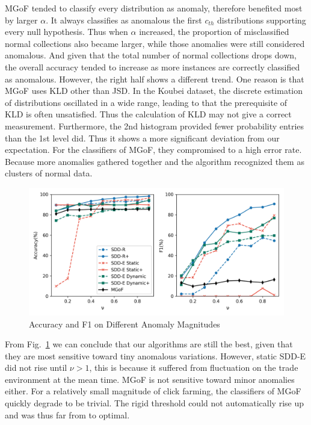 \documentclass[10pt,conference,letterpaper]{article}
\begin{document}
			MGoF tended to classify every distribution as anomaly, therefore benefited most by larger $\alpha$. It always classifies as anomalous the first $c_{th}$ distributions supporting every null hypothesis. Thus when $\alpha$ increased, the proportion of misclassified normal collections also became larger, while those anomalies were still considered anomalous. And given that the total number of normal collections drops down, the overall accuracy tended to increase as more instances are correctly classified as anomalous. However, the right half shows a different trend. One reason is that MGoF uses KLD other than JSD. In the Koubei dataset, the discrete estimation of distributions oscillated in a wide range, leading to that the prerequisite of KLD is often unsatisfied. Thus the calculation of KLD may not give a correct measurement. Furthermore, the 2nd histogram provided fewer probability entries than the 1st level did. Thus it shows a more significant deviation from our expectation.
			For the classifiers of MGoF, they  compromised to a high error rate. Because more anomalies gathered together and the algorithm recognized them as clusters of normal data.
			
			\begin{figure}[!t]
				\includegraphics[width=\linewidth]{fig/PerformanceOnAnomalyMagnitude.png}
				\caption{Accuracy and F1 on Different Anomaly Magnitudes}
				\label{fig:anomaly-magnitude}
			\end{figure}
			
			From Fig.~\ref{fig:anomaly-magnitude} we can conclude that our algorithms are still the best, given that they are most sensitive toward tiny anomalous variations. However, static SDD-E did not rise until $\nu > 1$, this is because it suffered from fluctuation on the trade environment at the mean time. MGoF is not sensitive toward minor anomalies either.
			For a relatively small magnitude of click farming, the classifiers of MGoF quickly degrade to be trivial. The rigid threshold could not automatically rise up and was thus far from to optimal. 
		
\end{document}
